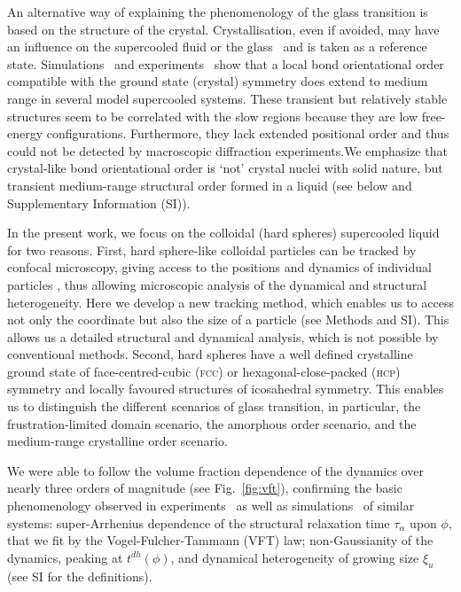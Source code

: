 An alternative way of explaining the phenomenology of the glass transition is based on the structure of the crystal. Crystallisation, even if avoided, may have an influence on the supercooled fluid or the glass~\citep{TanakaGJPCM, Cavagna2003, VanMegen2009a} and is taken as a reference state. Simulations~\cite{tanaka2010critical, Pedersen2010, Coslovich2011} and experiments~\citep{tanaka2010critical} show that a local bond orientational order compatible with the ground state (crystal) symmetry does extend to medium range in several model supercooled systems. These transient but relatively stable structures seem to be correlated with the slow regions because they are low free-energy configurations. Furthermore, they lack extended positional order and thus could not be detected by macroscopic diffraction experiments.We emphasize that crystal-like bond orientational order is `not' crystal nuclei with solid nature, but transient medium-range structural order formed in a liquid (see below and Supplementary Information (SI)). 

In the present work, we focus on the colloidal (hard spheres) supercooled liquid \cite{pusey1987ogt} for two reasons. First, hard sphere-like colloidal particles can be tracked by confocal microscopy, giving access to the positions and dynamics of individual particles \cite{kegel2000swe, weeks2000}, thus allowing microscopic analysis of the dynamical and structural heterogeneity. Here we develop a new tracking method, which enables us to access not only the coordinate but also the size of a particle (see Methods and SI). This allows us a detailed structural and dynamical analysis, which is not possible by conventional methods.  Second, hard spheres have a well defined crystalline ground state of face-centred-cubic (\textsc{fcc}) or hexagonal-close-packed (\textsc{hcp}) symmetry and locally favoured structures of icosahedral symmetry. This enables us to distinguish the different scenarios of glass transition, in particular, the frustration-limited domain scenario, the amorphous order scenario, and the medium-range crystalline order scenario.



We were able to follow the volume fraction dependence of the dynamics over nearly three orders of magnitude (see Fig.~\ref{fig:vft}), confirming the basic phenomenology observed in experiments~\citep{pusey1987ogt, kegel2000swe, weeks2000, BerthierR} as well as simulations~\citep{tanaka2010critical} of similar systems: super-Arrhenius dependence of the structural relaxation time $\tau_\alpha$ upon $\phi$, that we fit by the Vogel-Fulcher-Tammann (VFT) law; non-Gaussianity of the dynamics, peaking at $t^{dh}(\phi)$, and dynamical heterogeneity of growing size $\xi_u$ (see SI for the definitions). 



